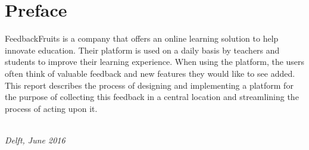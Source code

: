 \chapter*{Preface}

FeedbackFruits is a company that offers an online learning solution to help innovate education. Their platform is used on a daily basis by teachers and students to improve their learning experience. When using the platform, the users often think of valuable feedback and new features they would like to see added. This report describes the process of designing and implementing a platform for the purpose of collecting this feedback in a central location and streamlining the process of acting upon it.

\begin{flushright}
{\makeatletter\itshape
    \@author \\
    Delft, June 2016
\makeatother}
\end{flushright}

